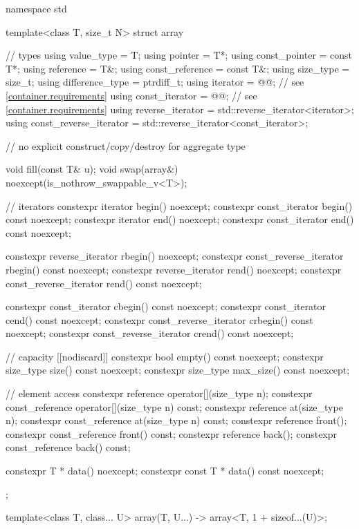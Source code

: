 \begin{codeblock}
namespace std {
  template<class T, size_t N>
  struct array {
    // types
    using value_type             = T;
    using pointer                = T*;
    using const_pointer          = const T*;
    using reference              = T&;
    using const_reference        = const T&;
    using size_type              = size_t;
    using difference_type        = ptrdiff_t;
    using iterator               = @@; // see \ref{container.requirements}
    using const_iterator         = @@; // see \ref{container.requirements}
    using reverse_iterator       = std::reverse_iterator<iterator>;
    using const_reverse_iterator = std::reverse_iterator<const_iterator>;

    // no explicit construct/copy/destroy for aggregate type

    void fill(const T& u);
    void swap(array&) noexcept(is_nothrow_swappable_v<T>);

    // iterators
    constexpr iterator               begin() noexcept;
    constexpr const_iterator         begin() const noexcept;
    constexpr iterator               end() noexcept;
    constexpr const_iterator         end() const noexcept;

    constexpr reverse_iterator       rbegin() noexcept;
    constexpr const_reverse_iterator rbegin() const noexcept;
    constexpr reverse_iterator       rend() noexcept;
    constexpr const_reverse_iterator rend() const noexcept;

    constexpr const_iterator         cbegin() const noexcept;
    constexpr const_iterator         cend() const noexcept;
    constexpr const_reverse_iterator crbegin() const noexcept;
    constexpr const_reverse_iterator crend() const noexcept;

    // capacity
    [[nodiscard]] constexpr bool empty() const noexcept;
    constexpr size_type size() const noexcept;
    constexpr size_type max_size() const noexcept;

    // element access
    constexpr reference       operator[](size_type n);
    constexpr const_reference operator[](size_type n) const;
    constexpr reference       at(size_type n);
    constexpr const_reference at(size_type n) const;
    constexpr reference       front();
    constexpr const_reference front() const;
    constexpr reference       back();
    constexpr const_reference back() const;

    constexpr T *       data() noexcept;
    constexpr const T * data() const noexcept;
  };

  template<class T, class... U>
    array(T, U...) -> array<T, 1 + sizeof...(U)>;
}
\end{codeblock}

